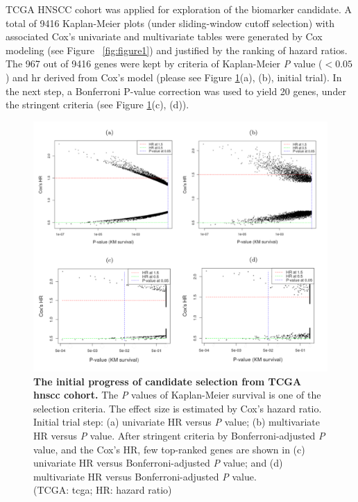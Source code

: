 \documentclass[jpm,article,submit,moreauthors,pdftex]{Definitions/mdpi}
\newcommand{\bcaption}[2]{\caption{\textbf{#1} #2}}
\newenvironment{MyColorPar}[1]{%
    \leavevmode\color{#1}\ignorespaces%
}{%
}%
\begin{document}
\begin{MyColorPar}{red}
TCGA HNSCC cohort was applied for exploration of the biomarker candidate.
A total of 9416 Kaplan-Meier plots (under sliding-window cutoff selection) with associated Cox's univariate and multivariate tables were generated by Cox modeling (see Figure ~\ref{fig:figure1}) and justified by the ranking of hazard ratios.
The 967 out of 9416 genes were kept by criteria of Kaplan-Meier \textit{P} value ($< 0.05$) and \acrfull{hr} derived from Cox's model (please see Figure \ref{fig:figure2}(a), (b), initial trial).
In the next step, a Bonferroni P-value correction was used to yield 20 genes, under the stringent criteria (see Figure \ref{fig:figure2}(c), (d)).

\begin{figure}[hbt!]
\centering
\includegraphics[width=14cm]{Figure2.pdf}
\bcaption{The initial progress of candidate selection from TCGA \acrshort{hnscc} cohort.}{The \textit{P} values of Kaplan-Meier survival is one of the selection criteria.
The effect size is estimated by Cox's hazard ratio.
Initial trial step: (a) univariate HR versus \textit{P} value; (b) multivariate HR versus \textit{P} value.
After stringent criteria by Bonferroni-adjusted \textit{P} value, and the Cox's HR, few top-ranked genes are shown in
(c) univariate HR versus Bonferroni-adjusted \textit{P} value; and (d) multivariate HR versus Bonferroni-adjusted \textit{P} value.\\
(TCGA: \acrlong{tcga}; HR: hazard ratio)}
\label{fig:figure2}
\end{figure}


\end{MyColorPar}
\end{document}
